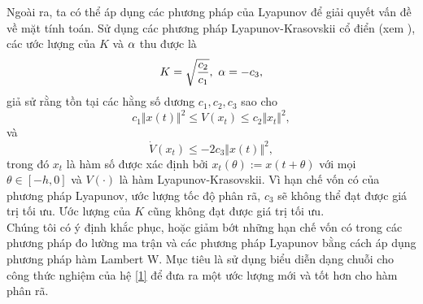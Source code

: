 Ngoài ra, ta có thể áp dụng các phương pháp của Lyapunov để giải
quyết vấn đề về mặt tính toán. Sử dụng các phương pháp Lyapunov-Krasovskii cổ điển (xem \cite{Hal93}), các ước lượng của $K$ và $\alpha$ thu được là
%
\begin{equation}\label{5}
	K = \sqrt{\dfrac{c_2}{c_1}},  \ \alpha = - c_3,
\end{equation}
%
giả sử rằng tồn tại các hằng số dương $c_1, c_2, c_3$ sao cho\\
%
\begin{equation}\label{6}
	c_1 \Vert x(t) \Vert ^2 \le V(x_t) \le c_2 \Vert x_t \Vert ^2,
\end{equation}
%
và
%
\begin{equation}\label{7}
	\dot{V}(x_t) \le -2c_3 \Vert x(t) \Vert ^2,
\end{equation}
%
trong đó $x_t$ là hàm số được xác định bởi $x_t(\theta) := x(t+ \theta)$ với mọi $\theta \in [-h, 0]$ và $V(\cdot)$ là hàm Lyapunov-Krasovskii. Vì hạn chế vốn có của phương pháp Lyapunov, ước lượng tốc độ phân rã, $c_3$ sẽ không thể đạt được giá trị tối ưu. Ước lượng của $K$ cũng không đạt được giá trị tối ưu.\\
%
Chúng tôi có ý định khắc phục, hoặc giảm bớt những hạn chế vốn có trong các phương pháp đo lường ma trận và các phương pháp Lyapunov bằng cách áp dụng phương pháp hàm Lambert W. 
Mục tiêu là sử dụng biểu diễn dạng chuỗi cho công thức nghiệm của hệ \eqref{1} để đưa ra một ước lượng mới và tốt hơn cho hàm phân rã.

